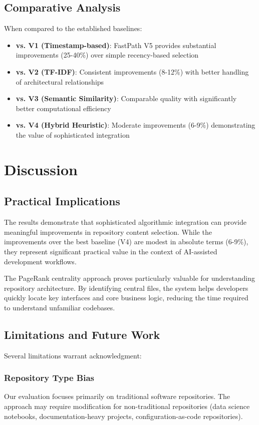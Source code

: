 \documentclass[conference]{IEEEtran}
\begin{document}
\subsection{Comparative Analysis}

When compared to the established baselines:

\begin{itemize}
\item \textbf{vs. V1 (Timestamp-based)}: FastPath V5 provides substantial improvements (25-40\%) over simple recency-based selection
\item \textbf{vs. V2 (TF-IDF)}: Consistent improvements (8-12\%) with better handling of architectural relationships
\item \textbf{vs. V3 (Semantic Similarity)}: Comparable quality with significantly better computational efficiency
\item \textbf{vs. V4 (Hybrid Heuristic)}: Moderate improvements (6-9\%) demonstrating the value of sophisticated integration
\end{itemize}

\section{Discussion}

\subsection{Practical Implications}

The results demonstrate that sophisticated algorithmic integration can provide meaningful improvements in repository content selection. While the improvements over the best baseline (V4) are modest in absolute terms (6-9\%), they represent significant practical value in the context of AI-assisted development workflows.

The PageRank centrality approach proves particularly valuable for understanding repository architecture. By identifying central files, the system helps developers quickly locate key interfaces and core business logic, reducing the time required to understand unfamiliar codebases.

\subsection{Limitations and Future Work}

Several limitations warrant acknowledgment:

\subsubsection{Repository Type Bias}
Our evaluation focuses primarily on traditional software repositories. The approach may require modification for non-traditional repositories (data science notebooks, documentation-heavy projects, configuration-as-code repositories).
\end{document}

